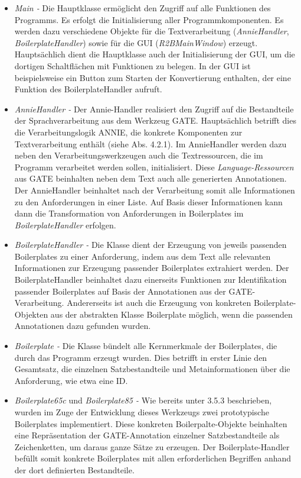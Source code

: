 \documentclass[12pt]{report}
\begin{document}
\begin{itemize}
\item \textit{Main -} Die Hauptklasse ermöglicht den Zugriff auf alle Funktionen des Programms. Es erfolgt die Initialisierung aller Programmkomponenten. Es werden dazu verschiedene Objekte für die Textverarbeitung (\textit{AnnieHandler}, \textit{BoilerplateHandler}) sowie für die GUI (\textit{R2BMainWindow}) erzeugt. Hauptsächlich dient die Hauptklasse auch der Initialisierung der GUI, um die dortigen Schaltflächen mit Funktionen zu belegen. In der GUI ist beispielsweise ein Button zum Starten der Konvertierung enthalten, der eine Funktion des BoilerplateHandler aufruft. 
\item \textit{AnnieHandler -} Der Annie-Handler realisiert den Zugriff auf die Bestandteile der Sprachverarbeitung aus dem Werkzeug GATE. Hauptsächlich betrifft dies die Verarbeitungslogik ANNIE, die konkrete Komponenten zur Textverarbeitung enthält (siehe Abs. 4.2.1). Im AnnieHandler werden dazu neben den Verarbeitungswerkzeugen auch die Textressourcen, die im Programm verarbeitet werden sollen, initialisiert. Diese \textit{Language-Ressourcen} aus GATE beinhalten neben dem Text auch alle generierten Annotationen. Der AnnieHandler beinhaltet nach der Verarbeitung somit alle Informationen zu den Anforderungen in einer Liste. Auf Basis dieser Informationen kann dann die Transformation von Anforderungen in Boilerplates im \textit{BoilerplateHandler} erfolgen.
\item \textit{BoilerplateHandler -} Die Klasse dient der Erzeugung von jeweils passenden Boilerplates zu einer Anforderung, indem aus dem Text alle relevanten Informationen zur Erzeugung passender Boilerplates extrahiert werden. Der BoilerplateHandler beinhaltet dazu einerseits Funktionen zur Identifikation passender Boilerplates auf Basis der Annotationen aus der GATE-Verarbeitung. Andererseits ist auch die Erzeugung von konkreten Boilerplate-Objekten aus der abstrakten Klasse Boilerplate möglich, wenn die passenden Annotationen dazu gefunden wurden.
\item \textit{Boilerplate -} Die Klasse bündelt alle Kernmerkmale der Boilerplates, die durch das Programm erzeugt wurden. Dies betrifft in erster Linie den Gesamtsatz, die einzelnen Satzbestandteile und Metainformationen über die Anforderung, wie etwa eine ID.
\item \textit{Boilerplate65c} und \textit{Boilerplate85 -} Wie bereits unter 3.5.3 beschrieben, wurden im Zuge der Entwicklung dieses Werkzeugs zwei prototypische Boilerplates implementiert. Diese konkreten Boilerpalte-Objekte beinhalten eine Repräsentation der GATE-Annotation einzelner Satzbestandteile als Zeichenketten, um daraus ganze Sätze zu erzeugen. Der Boilerplate-Handler \glqq befüllt\grqq{} somit konkrete Boilerplates mit allen erforderlichen Begriffen anhand der dort definierten Bestandteile.

\end{itemize}
\end{document}
